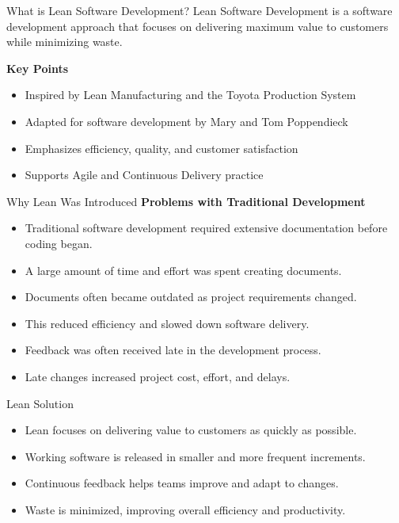 \documentclass{thapathali}
\begin{document}
\begin{frame}{What is Lean Software Development?}
    Lean Software Development is a software development approach that focuses on delivering maximum value to customers while minimizing waste.
    \vspace{0.8em}
    
    \textbf{Key Points}
    \begin{itemize}
        \item Inspired by Lean Manufacturing and the Toyota Production System
        \item Adapted for software development by Mary and Tom Poppendieck
        \item Emphasizes efficiency, quality, and customer satisfaction
        \item Supports Agile and Continuous Delivery practice
    \end{itemize}
\end{frame}

\begin{frame}{Why Lean Was Introduced}
    \textbf{Problems with Traditional Development}
    \vspace{0.5em}
    
    \begin{itemize}
        \item Traditional software development required extensive documentation before coding began.
        \item A large amount of time and effort was spent creating documents.
        \item Documents often became outdated as project requirements changed.
        \item This reduced efficiency and slowed down software delivery.
        \item Feedback was often received late in the development process.
        \item Late changes increased project cost, effort, and delays.
    \end{itemize}
\end{frame}

\begin{frame}{Lean Solution}
    \begin{itemize}
        \item Lean focuses on delivering value to customers as quickly as possible.
        \item Working software is released in smaller and more frequent increments.
        \item Continuous feedback helps teams improve and adapt to changes.
        \item Waste is minimized, improving overall efficiency and productivity.
    \end{itemize}
\end{frame}
\end{document}
